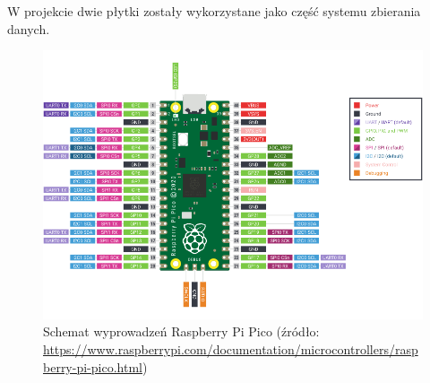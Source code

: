 W projekcie dwie płytki zostały wykorzystane jako część systemu zbierania danych.

\begin{figure}[b!]
    \begin{center}
        \includegraphics[width=13cm]{pic/pico-pinout.png}
    \end{center}
    \caption{Schemat wyprowadzeń Raspberry Pi Pico (źródło: \url{https://www.raspberrypi.com/documentation/microcontrollers/raspberry-pi-pico.html})}
    \label{fig:pico-pinout}
\end{figure}





